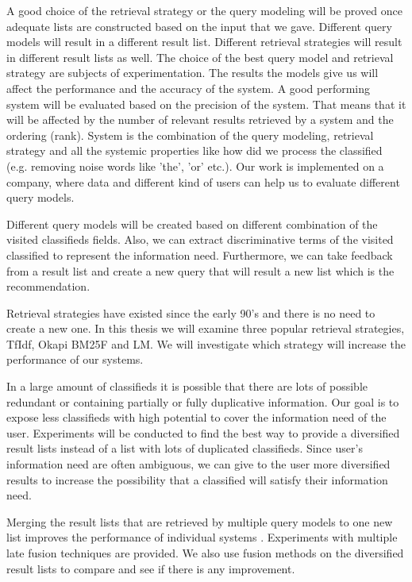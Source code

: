 A good choice of the retrieval strategy or the query modeling will be proved once adequate lists are constructed based on the input that we gave. Different query models will result in a different result list. Different retrieval strategies will result in different result lists as well. The choice of the best query model and retrieval strategy are subjects of experimentation. The results the models give us will affect the performance and the accuracy of the system. A good performing system will be evaluated based on the precision of the system. That means that it will be affected by the number of relevant results retrieved by a system and the ordering (rank). System is the combination of the query modeling, retrieval strategy and all the systemic properties like how did we process the classified (e.g. removing noise words like 'the', 'or' etc.). Our work is implemented on a company, where data and different kind of users can help us to evaluate different query models.

Different query models will be created based on different combination of the visited classifieds fields. Also, we can extract discriminative terms of the visited classified to represent the information need. Furthermore, we can take feedback from a result list and create a new query that will result a new list which is the recommendation.

Retrieval strategies have existed since the early 90's and there is no need to create a new one. In this thesis we will examine three popular retrieval strategies, TfIdf, Okapi BM25F and LM. We will investigate which strategy will increase the performance of our systems.

In a large amount of classifieds it is possible that there are lots of possible redundant or containing partially or fully duplicative information. Our goal is to expose less classifieds with high potential to cover the information need of the user. Experiments will be conducted to find the best way to provide a diversified result lists instead of a list with lots of duplicated classifieds. Since user's information need are often ambiguous, we can give to the user more diversified results to increase the possibility that a classified will satisfy their information need.


 Merging the result lists that are retrieved by multiple query models to one new list improves the performance of individual systems \cite{Belkin}. Experiments with multiple late fusion techniques are provided. We also use fusion methods on the diversified result lists to compare and see if there is any improvement.

